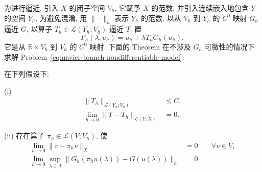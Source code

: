 为进行逼近, 引入 $X$ 的闭子空间 $V_h$, 它赋予 $X$ 的范数;
并引入连续嵌入地包含 $Y$ 的空间 $Y_h$. 为避免混淆, 用
$\|\cdot\|_h$ 表示 $Y_h$ 的范数. 以从 $V_h$ 到 $Y_h$ 的 $C^0$ 映射
$G_h$ 逼近 $G$, 以算子 $T_h\in\mathcal L(Y_h;V_h)$ 逼近 $T$. 置
\setcounter{equation}{57}
\begin{equation}\label{eq:navier-branch-nondifferentiable-discrete-map}
F_h(\lambda,u_h)=u_h+\lambda T_hG_h(u_h),
\end{equation}
它是从 $\mathbb R\times V_h$ 到 $V_h$ 的 $C^0$ 映射.
下面的 Theorem 在不涉及 $G_h$ 可微性的情况下求解
Problem~\eqref{eq:navier-branch-nondifferentiable-model}.

\setcounter{statement}{7}
\begin{Theorem}\label{thm:navier-branch-nondifferentiable-approximation}
在下列假设下:

\textup{(i)}
\begin{align}
\|T_h\|_{\mathcal L(Y_h;V_h)}&\leq C,
\label{eq:navier-branch-th-bounded}\\
\lim_{h\to0}\|T-T_h\|_{\mathcal L(Y;X)}&=0.
\label{eq:navier-branch-th-converges}
\end{align}

\textup{(ii)} 存在算子 $\pi_h\in\mathcal L(V;V_h)$, 使
\begin{align}
\lim_{h\to0}\|v-\pi_hv\|_X&=0
&&\forall v\in V,
\label{eq:navier-branch-pi-converges}\\
\lim_{h\to0}\sup_{\lambda\in\Lambda}
\|G_h(\pi_hu(\lambda))-G(u(\lambda))\|_h&=0.
\label{eq:navier-branch-gh-consistency}
\end{align}


\end{Theorem}
